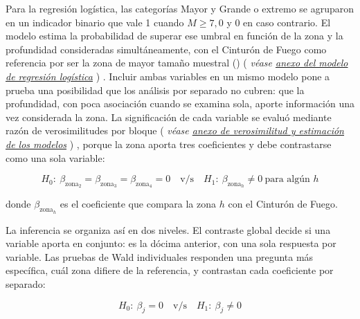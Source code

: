\documentclass[
  spanish,
  letterpaper,
  DIV=11,
  numbers=noendperiod]{scrartcl}
\newcommand{\asesoriaParenRef}[1]{%
  \textnormal{\textcolor{asesoriaTextColor}{(}}%
  {\hypersetup{linkcolor=asesoriaLinkColor,urlcolor=asesoriaLinkColor,citecolor=asesoriaLinkColor}\textcolor{asesoriaTextColor}{\emph{#1}}}%
  \textnormal{\textcolor{asesoriaTextColor}{)}}%
}
\begin{document}
Para la regresión logística, las categorías Mayor y Grande o extremo se
agruparon en un indicador binario que vale 1 cuando \(M \geq 7{,}0\) y 0
en caso contrario. El modelo estima la probabilidad de superar ese
umbral en función de la zona y la profundidad consideradas
simultáneamente, con el Cinturón de Fuego como referencia por ser la
zona de mayor tamaño muestral
()
\asesoriaParenRef{véase \hyperref[sec-anexo-logistica]{anexo del modelo de regresión logística}}.
Incluir ambas variables en un mismo modelo pone a prueba una posibilidad
que los análisis por separado no cubren: que la profundidad, con poca
asociación cuando se examina sola, aporte información una vez
considerada la zona. La significación de cada variable se evaluó
mediante razón de verosimilitudes por bloque
\asesoriaParenRef{véase \hyperref[sec-anexo-verosimilitud]{anexo de verosimilitud y estimación de los modelos}},
porque la zona aporta tres coeficientes y debe contrastarse como una
sola variable:

\begingroup
\setlength{\abovedisplayskip}{0pt}
\setlength{\belowdisplayskip}{0pt}
\setlength{\abovedisplayshortskip}{0pt}
\setlength{\belowdisplayshortskip}{0pt}
\vspace{-1.10em}
\[
H_0:\ \beta_{\text{zona}_2}=\beta_{\text{zona}_3}=\beta_{\text{zona}_4}=0
\quad \text{v/s} \quad
H_1:\ \beta_{\text{zona}_h}\neq 0 \ \text{para algún } h
\]
\vspace{-1.15em}
\endgroup

donde \(\beta_{\text{zona}_h}\) es el coeficiente que compara la zona
\(h\) con el Cinturón de Fuego.

La inferencia se organiza así en dos niveles. El contraste global decide
si una variable aporta en conjunto: es la dócima anterior, con una sola
respuesta por variable. Las pruebas de Wald individuales responden una
pregunta más específica, cuál zona difiere de la referencia, y
contrastan cada coeficiente por separado:

\begingroup
\setlength{\abovedisplayskip}{0pt}
\setlength{\belowdisplayskip}{0pt}
\setlength{\abovedisplayshortskip}{0pt}
\setlength{\belowdisplayshortskip}{0pt}
\vspace{-1.10em}
\[
H_0:\ \beta_{j}=0
\quad \text{v/s} \quad
H_1:\ \beta_{j}\neq 0
\]
\vspace{-1.15em}
\endgroup
\end{document}
